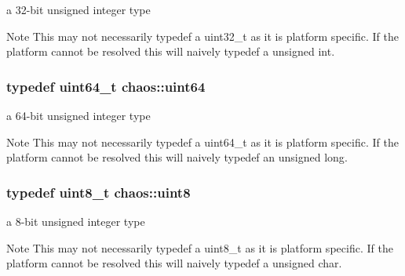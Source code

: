 a 32-\/bit unsigned integer type 

\begin{DoxyNote}{Note}
This may not necessarily {\ttfamily typedef} a {\ttfamily uint32\-\_\-t} as it is platform specific. If the platform cannot be resolved this will naively {\ttfamily typedef} a {\ttfamily unsigned int}. 
\end{DoxyNote}
\hypertarget{namespacechaos_a34fe5f5bfc3ef6d80b5d094ed91b4d6e}{
\subsubsection[{uint64}]{\setlength{\rightskip}{0pt plus 5cm}typedef uint64\-\_\-t {\bf chaos\-::uint64}}}\label{namespacechaos_a34fe5f5bfc3ef6d80b5d094ed91b4d6e}


a 64-\/bit unsigned integer type 

\begin{DoxyNote}{Note}
This may not necessarily {\ttfamily typedef} a {\ttfamily uint64\-\_\-t} as it is platform specific. If the platform cannot be resolved this will naively {\ttfamily typedef} an {\ttfamily unsigned long}. 
\end{DoxyNote}
\hypertarget{namespacechaos_a229e18634387996c2712d57f184bf363}{
\subsubsection[{uint8}]{\setlength{\rightskip}{0pt plus 5cm}typedef uint8\-\_\-t {\bf chaos\-::uint8}}}\label{namespacechaos_a229e18634387996c2712d57f184bf363}


a 8-\/bit unsigned integer type 

\begin{DoxyNote}{Note}
This may not necessarily {\ttfamily typedef} a {\ttfamily uint8\-\_\-t} as it is platform specific. If the platform cannot be resolved this will naively {\ttfamily typedef} a {\ttfamily unsigned char}. 
\end{DoxyNote}
